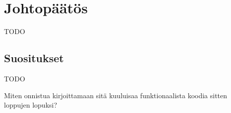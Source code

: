\vspace{21.5pt}
\chapter{Johtopäätös}

TODO

\section{Suositukset}

TODO

Miten onnistua kirjoittamaan sitä kuuluisaa funktionaalista koodia sitten loppujen lopuksi?

